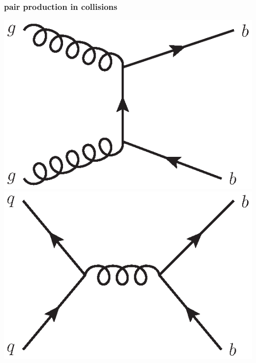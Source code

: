 \documentclass[aspectratio=1610]{beamer}
\begin{document}
\begin{frame}\frametitle{\bquark\bquarkbar pair production in \proton\proton collisions}

\centering
\includegraphics[width=0.4\paperwidth]{figs/detector/gluon_fusion.eps}
\includegraphics[width=0.4\paperwidth]{figs/detector/quark_antiquark_annihilation.eps}

\end{frame}


      
\end{document}
